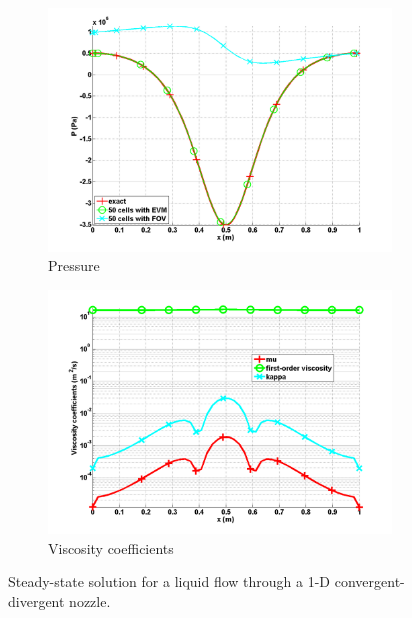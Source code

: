\documentclass[preprint,10pt]{elsarticle}
\begin{document}
\begin{figure}[H]
        \begin{subfigure}[b]{0.495\textwidth}
                \centering
                \includegraphics[width=\textwidth]{liquid_pressure_numerical_and_exact_50.png}
                \caption{Pressure}
                \label{fig:1d_nozzle_liq_press}
        \end{subfigure}
        
        \begin{subfigure}[b]{0.495\textwidth}
                \centering
                \includegraphics[width=\textwidth]{liquid_viscosity_numerical50.png}
                \caption{Viscosity coefficients}
                \label{fig:1d_nozzle_liq_visc}
        \end{subfigure}
        \caption{Steady-state solution for a liquid flow through a 1-D convergent-divergent nozzle.}\label{fig:1d_liq_nozzle}
\end{figure}
\end{document}

